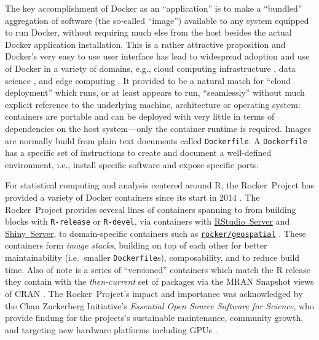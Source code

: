 The key accomplishment of Docker as an ``application'' is to make a
``bundled'' aggregation of software (the so-called ``image'') available
to any system equipped to run Docker, without requiring much else from
the host besides the actual Docker application installation. This is a
rather attractive proposition and Docker's very easy to use user
interface has lead to widespread adoption and use of Docker in a variety
of domains, e.g., cloud computing infrastructure
\citep[e.g.,][]{Bernstein2014}, data science
\citep[e.g.,][]{boettiger_introduction_2015}, and edge computing
\citep[e.g.,][]{alam_orchestration_2018}. It provided to be a natural
match for ``cloud deployment'' which runs, or at least appears to run,
``seamlessly'' without much explicit reference to the underlying
machine, architecture or operating system: containers are portable and
can be deployed with very little in terms of dependencies on the host
system---only the container runtime is required. Images are normally
build from plain text documents called \texttt{Dockerfile}. A
\texttt{Dockerfile} has a specific set of instructions to create and
document a well-defined environment, i.e., install specific software and
expose specific ports.

For statistical computing and analysis centered around R, the
Rocker~Project has provided a variety of Docker containers since its
start in 2014 \citep{RJ-2017-065}. The Rocker~Project provides several
lines of containers spanning to from building blocks with
\texttt{R-release} or \texttt{R-devel}, via containers with
\href{https://rstudio.com/products/rstudio/}{RStudio~Server} and
\href{https://rstudio.com/products/shiny/shiny-server/}{Shiny~Server},
to domain-specific containers such as
\href{https://github.com/rocker-org/geospatial}{\texttt{rocker/geospatial}}
\citep{rocker_geospatial_2019}. These containers form \emph{image
stacks}, building on top of each other for better maintainability
(i.e.~smaller \texttt{Dockerfile}s), composability, and to reduce build
time. Also of note is a series of ``versioned'' containers which match
the R release they contain with the \emph{then-current} set of packages
via the MRAN Snapshot views of CRAN \citep{microsoft_cran_2019}. The
Rocker~Project's impact and importance was acknowledged by the Chan
Zuckerberg Initiative's \emph{Essential Open Source Software for
Science}, who provide findung for the projects's sustainable
maintenance, community growth, and targeting new hardware platforms
including GPUs \citep{chan_zuckerberg_initiative_maintaining_2019}.

